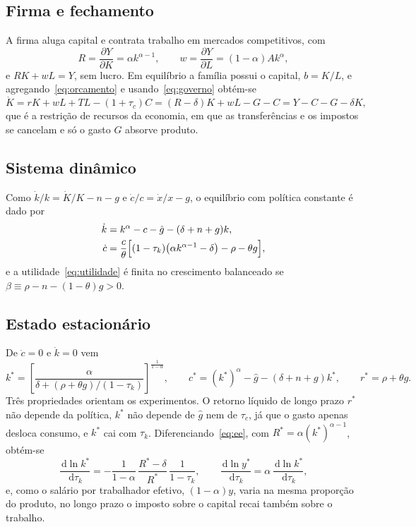 \documentclass[11pt,a4paper]{article}
\newcommand{\dd}{\,\mathrm{d}}
\begin{document}
\subsection{Firma e fechamento}
A firma aluga capital e contrata trabalho em mercados competitivos, com
\begin{equation}
 R=\frac{\partial Y}{\partial K}=\alpha k^{\alpha-1},\qquad
 w=\frac{\partial Y}{\partial L}=(1-\alpha)Ak^\alpha,
 \label{eq:precos}
\end{equation}
e $RK+wL=Y$, sem lucro. Em equilíbrio a família possui o capital, $b=K/L$, e
agregando~\eqref{eq:orcamento} e usando~\eqref{eq:governo} obtém-se
\[
 \dot K=rK+wL+TL-(1+\tau_c)C=(R-\delta)K+wL-G-C=Y-C-G-\delta K,
\]
que é a restrição de recursos da economia, em que as transferências e os
impostos se cancelam e só o gasto $G$ absorve produto.

\subsection{Sistema dinâmico}
Como $\dot k/k=\dot K/K-n-g$ e $\dot c/c=\dot x/x-g$, o equilíbrio com política
constante é dado por
\begin{align}
 \dot k&=k^\alpha-c-\hat g-(\delta+n+g)k, \label{eq:kdot}\\
 \dot c&=\frac{c}{\theta}\Bigl[(1-\tau_k)\bigl(\alpha k^{\alpha-1}-\delta\bigr)-\rho-\theta g\Bigr],
 \label{eq:cdot}
\end{align}
e a utilidade~\eqref{eq:utilidade} é finita no crescimento balanceado se
$\beta\equiv\rho-n-(1-\theta)g>0$.

\subsection{Estado estacionário}
De $\dot c=0$ e $\dot k=0$ vem
\begin{equation}
 k^*=\left[\frac{\alpha}{\delta+(\rho+\theta g)/(1-\tau_k)}\right]^{\frac1{1-\alpha}},
 \qquad
 c^*=(k^*)^\alpha-\hat g-(\delta+n+g)k^*,
 \qquad
 r^*=\rho+\theta g.
 \label{eq:ee}
\end{equation}
Três propriedades orientam os experimentos. O retorno líquido de longo prazo
$r^*$ não depende da política, $k^*$ não depende de $\hat g$ nem de $\tau_c$,
já que o gasto apenas desloca consumo, e $k^*$ cai com $\tau_k$.
Diferenciando~\eqref{eq:ee}, com $R^*=\alpha (k^*)^{\alpha-1}$, obtém-se
\begin{equation}
 \frac{\dd\ln k^*}{\dd\tau_k}
 =-\frac{1}{1-\alpha}\,\frac{R^*-\delta}{R^*}\,\frac{1}{1-\tau_k},
 \qquad
 \frac{\dd\ln y^*}{\dd\tau_k}=\alpha\,\frac{\dd\ln k^*}{\dd\tau_k},
 \label{eq:elasticidade}
\end{equation}
e, como o salário por trabalhador efetivo, $(1-\alpha)y$, varia na mesma
proporção do produto, no longo prazo o imposto sobre o capital recai também
sobre o trabalho.
\end{document}
